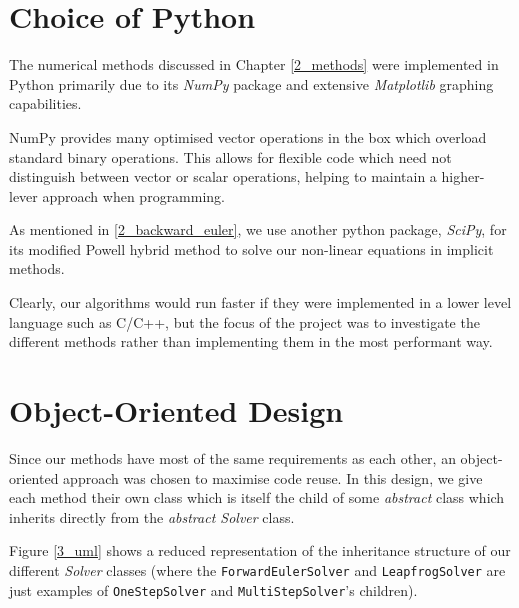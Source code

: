 \documentclass[12pt, twoside]{report}
\theoremstyle{plain}
\theoremstyle{definition}
\theoremstyle{definition}
\begin{document}
    \section{Choice of Python}
    \label{3_python}
        The numerical methods discussed in Chapter \ref{2_methods} were 
        implemented in Python primarily due to its \textit{NumPy} package
        and extensive \textit{Matplotlib} graphing capabilities. 

        NumPy provides many optimised vector operations in the box which 
        overload standard binary operations. This allows for flexible code 
        which need not distinguish between vector or scalar operations, 
        helping to maintain a higher-lever approach when programming.

        As mentioned in \ref{2_backward_euler}, we use another python package,
        \textit{SciPy}, for its modified Powell hybrid method to solve our
        non-linear equations in implicit methods. 

        Clearly, our algorithms would run faster if they were implemented in a
        lower level language such as C/C++, but the focus of the project was to
        investigate the different methods rather than implementing them in the 
        most performant way. 


    \section{Object-Oriented Design}
    \label{3_oo}
        Since our methods have most of the same requirements as each other, an 
        object-oriented approach was chosen to maximise code reuse. In this 
        design, we give each method their own class which is itself the child 
        of some \textit{abstract} class which inherits directly from the 
        \textit{abstract Solver} class. 

        Figure \ref{3_uml} shows a reduced representation of the inheritance
        structure of our different \textit{Solver} classes (where the 
        \texttt{ForwardEulerSolver} and 
        \texttt{LeapfrogSolver} are just examples of 
        \texttt{OneStepSolver} and 
        \texttt{MultiStepSolver}'s children). 
\end{document}
